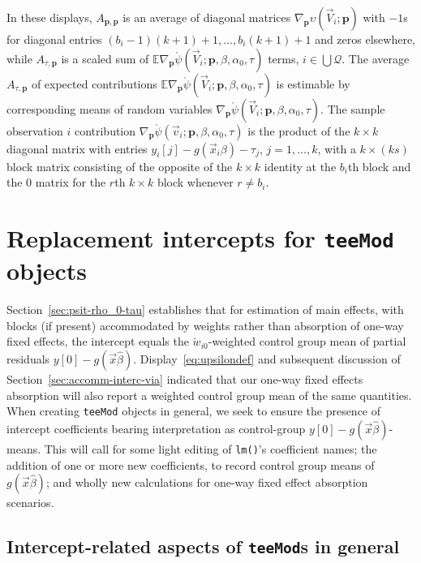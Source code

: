\documentclass{article}
\newcommand{\owt}[1][{[z_{i}]}]{\ensuremath{\check{w}_{i#1}}}
\newcommand{\absorbInterceptsEF}{\upsilon}
\begin{document}
In these displays, $A_{\mathbf{p}, \mathbf{p}}$ is
an average of diagonal matrices $\nabla_{\mathbf{p}}\absorbInterceptsEF(\vec{V}_{i};
\mathbf{p})$ with $-1$s for diagonal entries $(b_{i}-1)(k+1)+1, \ldots,
b_{i}(k+1) +1$ and zeros elsewhere, while $A_{\tau,
  \mathbf{p}}$ is a scaled sum of $\mathbb{E} \nabla_{\mathbf{p}}\acute{\psi}(\vec{V}_{i};
\mathbf{p}, \beta, \alpha_{0}, \tau)$ terms, $i \in \bigcup \mathcal{Q}$. The average $A_{\tau,
  \mathbf{p}}$ of expected contributions $\mathbb{E} \nabla_{\mathbf{p}}\acute{\psi}(\vec{V}_{i};
\mathbf{p}, \beta, \alpha_{0}, \tau)$ is estimable by corresponding means of
random variables $\nabla_{\mathbf{p}}\acute{\psi}(\vec{V}_{i};
\mathbf{p}, \beta, \alpha_{0}, \tau)$.  The sample observation $i$ contribution $\nabla_{\mathbf{p}}\acute{\psi}(\vec{v}_{i};
\mathbf{p}, \beta, \alpha_{0}, \tau)$ is the product of the $k \times k$
diagonal matrix with entries $y_{i}[j] - g(\vec{x}_{i}\beta) -
\tau_{j}$, $j=1, \ldots, k$, with a $k \times (ks)$ block matrix
consisting of the opposite of the $k\times k$ identity at the
$b_{i}$th block and the 0 matrix for the $r$th $k \times k$ block whenever
$r\neq b_{i}$.

\section{Replacement intercepts for \texttt{teeMod} objects}%
\label{sec:repl-interc-textttt}
Section~\ref{sec:psit-rho_0-tau} establishes that for estimation of
main effects, with blocks (if present) accommodated by weights rather than
absorption of one-way fixed effects, the intercept equals the
$\owt[0]$-weighted control group mean of partial residuals
$y[0] - g(\vec{x}\hat\beta)$. Display~\eqref{eq:upsilondef} and subsequent discussion of
Section~\ref{sec:accomm-interc-via} indicated that our one-way fixed effects absorption will
also report a weighted control group
mean of the same quantities.  When creating \texttt{teeMod} objects in
general, we seek to ensure the presence
of intercept coefficients bearing interpretation as control-group
$y[0] - g(\vec{x}\hat\beta)$-means.
This will call for some light editing of \texttt{lm()}'s
coefficient names; the addition of one or more new coefficients, to
record control group means of $g(\vec{x}\hat\beta)$; and wholly new
calculations for one-way fixed effect absorption scenarios.

\subsection{Intercept-related aspects of  \texttt{teeMod}s in general}%
\label{sec:interc-aspects-gen-teeMods}
\end{document}
